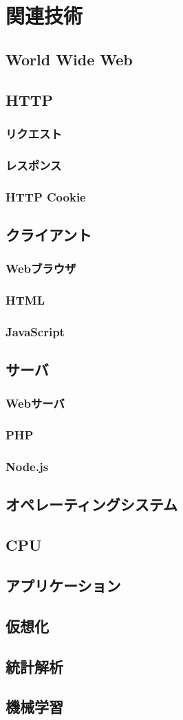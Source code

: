 \newpage
\section{関連技術}
\subsection{World Wide Web}
\subsection{HTTP}
\subsubsection{リクエスト}
\subsubsection{レスポンス}
\subsubsection{HTTP Cookie}
\subsection{クライアント}
\subsubsection{Webブラウザ}
\subsubsection{HTML}
\subsubsection{JavaScript}
\subsection{サーバ}
\subsubsection{Webサーバ}
\subsubsection{PHP}
\subsubsection{Node.js}
\subsection{オペレーティングシステム}
\subsection{CPU}
\subsection{アプリケーション}
\subsection{仮想化}
\subsection{統計解析}
\subsection{機械学習}
